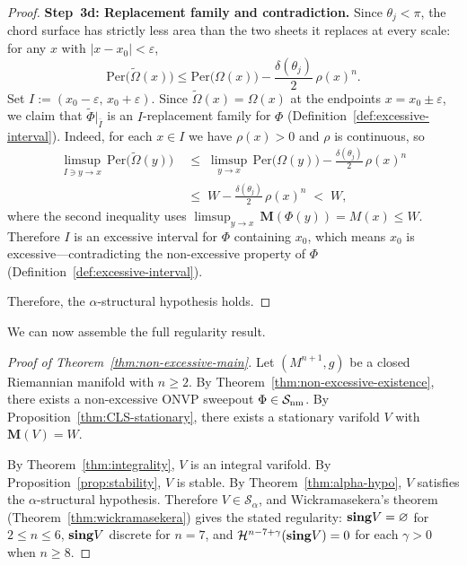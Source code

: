 \begin{proof}
\medskip\noindent\textbf{Step~3d: Replacement family and contradiction.}
Since $\theta_j < \pi$, the chord surface has strictly less area than the two sheets it replaces at every scale: for any $x$ with $|x - x_0| < \varepsilon$,
\[
    \mathrm{Per}\big(\tilde{\Omega}(x)\big) \leq \mathrm{Per}\big(\Omega(x)\big) - \frac{\delta(\theta_j)}{2}\,\rho(x)^n.
\]
Set $I := (x_0 - \varepsilon,\, x_0 + \varepsilon)$. Since $\tilde{\Omega}(x) = \Omega(x)$ at the endpoints $x = x_0 \pm \varepsilon$, we claim that $\tilde{\Phi}|_{\bar{I}}$ is an $I$-replacement family for $\Phi$ (Definition~\ref{def:excessive-interval}). Indeed, for each $x \in I$ we have $\rho(x) > 0$ and $\rho$ is continuous, so
\begin{align*}
    \limsup_{I \ni y \to x}\, \mathrm{Per}\big(\tilde{\Omega}(y)\big)
    &\;\leq\; \limsup_{y \to x}\, \mathrm{Per}\big(\Omega(y)\big)
    - \frac{\delta(\theta_j)}{2}\,\rho(x)^n \\
    &\;\leq\; W - \frac{\delta(\theta_j)}{2}\,\rho(x)^n
    \;<\; W,
\end{align*}
where the second inequality uses $\limsup_{y \to x}\,\mathbf{M}(\Phi(y)) = M(x) \leq W$.
Therefore $I$ is an excessive interval for $\Phi$ containing $x_0$, which means $x_0$ is excessive---contradicting the non-excessive property of $\Phi$ (Definition~\ref{def:excessive-interval}).

\medskip
Therefore, the $\alpha$-structural hypothesis holds.
\end{proof}

We can now assemble the full regularity result.

\begin{proof}[Proof of Theorem~\ref{thm:non-excessive-main}]
Let $(M^{n+1}, g)$ be a closed Riemannian manifold with $n \geq 2$. By Theorem~\ref{thm:non-excessive-existence}, there exists a non-excessive ONVP sweepout $\Phi \in \mathcal{S}_{\mathrm{nm}}$. By Proposition~\ref{thm:CLS-stationary}, there exists a stationary varifold $V$ with $\mathbf{M}(V) = W$.

By Theorem~\ref{thm:integrality}, $V$ is an integral varifold. By Proposition~\ref{prop:stability}, $V$ is stable. By Theorem~\ref{thm:alpha-hypo}, $V$ satisfies the $\alpha$-structural hypothesis. Therefore $V \in \mathcal{S}_\alpha$, and Wickramasekera's theorem (Theorem~\ref{thm:wickramasekera}) gives the stated regularity: $\mathbf{sing} V = \varnothing$ for $2 \leq n \leq 6$, $\mathbf{sing} V$ discrete for $n = 7$, and $\mathcal{H}^{n-7+\gamma}(\mathbf{sing} V) = 0$ for each $\gamma > 0$ when $n \geq 8$.
\end{proof}
